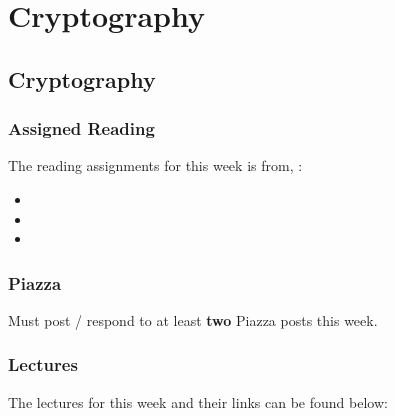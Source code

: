 \clearpage

\renewcommand{\ChapTitle}{Cryptography}
\renewcommand{\SectionTitle}{Cryptography}

\chapter{\ChapTitle}
\section{\SectionTitle}

\subsection{Assigned Reading}

The reading assignments for this week is from, \Textbook:

\begin{itemize}
    \item {}
    \item {}
    \item {}
\end{itemize}

\subsection{Piazza}

Must post / respond to at least \textbf{two} Piazza posts this week.

\subsection{Lectures}

The lectures for this week and their links can be found below:

